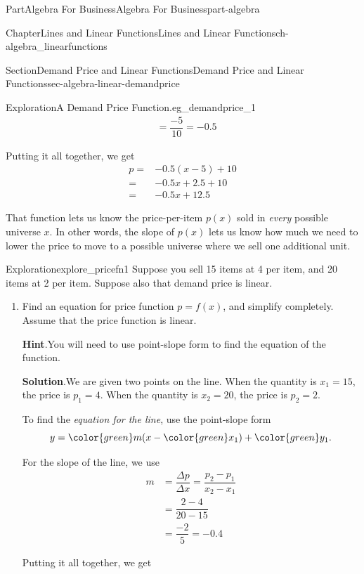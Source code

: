 \documentclass[oneside,10pt,]{tufte-book}
\newcommand{\blocktitlefont}{\relax}
\numberwithin{equation}{chapter}
\newcommand{\amp}{&}
\begin{document}
\begin{partptx}{Part}{Algebra For Business}{}{Algebra For Business}{}{}{part-algebra}
\begin{chapterptx}{Chapter}{Lines and Linear Functions}{}{Lines and Linear Functions}{}{}{ch-algebra_linearfunctions}
\begin{sectionptx}{Section}{Demand Price and Linear Functions}{}{Demand Price and Linear Functions}{}{}{sec-algebra-linear-demandprice}
\begin{exploration}{Exploration}{A Demand Price Function.}{eg_demandprice_1}
\begin{align*}
\amp = \dfrac{-5}{10}=-0.5
\end{align*}
%
\par
Putting it all together, we get%
\begin{align*}
p = \amp -0.5 (x-5) + 10\\
= \amp -0.5x + 2.5 + 10\\
= \amp -0.5x + 12.5
\end{align*}
%
\end{exploration}%
\par
That function lets us know the price-per-item \(p(x)\) sold in \emph{every} possible universe \(x\). In other words, the slope of \(p(x)\) lets us know how much we need to lower the price to move to a possible universe where we sell one additional unit.%
\begin{exploration}{Exploration}{}{explore_pricefn1}%
Suppose you sell 15 items at 4 \textdollar{} per item, and 20 items at 2 \textdollar{} per item. Suppose also that demand price is linear.%
\begin{enumerate}[font=\bfseries,label=(\alph*),ref=\alph*]%
\item{}Find an equation for price function \(p=f(x)\), and simplify completely.  Assume that the price function is linear.%
\par\smallskip%
\noindent\textbf{\blocktitlefont Hint}.\hypertarget{explore_pricefn1-2-2}{}\quad{}You will need to use point-slope form to find the equation of the function.%
\par\smallskip%
\noindent\textbf{\blocktitlefont Solution}.\hypertarget{explore_pricefn1-2-3}{}\quad{}We are given two points on the line.  When the quantity is \(x_1=15\), the price is \(p_1=4\).  When the quantity is \(x_2=20\), the price is \(p_2=2\).%
\par
To find the \emph{equation for the line}, use the point-slope form%
\begin{equation*}
y = {\color{green} m} (x - { \color{green} x_1}) + {\color{green} y_1} \text{.}
\end{equation*}
%
\par
For the slope of the line, we use%
\begin{align*}
m \amp = \dfrac{\Delta p}{\Delta x} = \dfrac{p_2-p_1}{x_2-x_1}\\
\amp = \dfrac{2-4}{20-15}\\
\amp = \dfrac{-2}{5}=-0.4
\end{align*}
%
\par
Putting it all together, we get%
\begin{equation*}

\end{equation*}
\end{enumerate}
\end{exploration}
\end{sectionptx}
\end{chapterptx}
\end{partptx}
\end{document}
